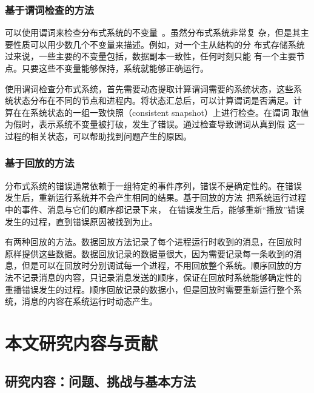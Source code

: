 \subsubsection*{基于谓词检查的方法}

可以使用谓词来检查分布式系统的不变量~\cite{d3s}。虽然分布式系统非常复
杂，但是其主要性质可以用少数几个不变量来描述。例如，对一个主从结构的分
布式存储系统过来说，一些主要的不变量包括，数据副本一致性，任何时刻只能
有一个主要节点。只要这些不变量能够保持，系统就能够正确运行。

使用谓词检查分布式系统，首先需要动态提取计算谓词需要的系统状态，这些系
统状态分布在不同的节点和进程内。将状态汇总后，可以计算谓词是否满足。计
算在在系统状态的一组一致快照（consistent snapshot）上进行检查。在谓词
取值为假时，表示系统不变量被打破，发生了错误。通过检查导致谓词从真到假
这一过程的相关状态，可以帮助找到问题产生的原因。

\subsubsection*{基于回放的方法}

分布式系统的错误通常依赖于一组特定的事件序列，错误不是确定性的。在错误
发生后，重新运行系统并不会产生相同的结果。基于回放的方法~\cite{liblog,
friday, r2, mpiwiz}把系统运行过程中的事件、消息与它们的顺序都记录下来，
在错误发生后，能够重新“播放”错误发生的过程，直到错误原因被找到为止。

有两种回放的方法。数据回放方法记录了每个进程运行时收到的消息，在回放时
原样提供这些数据。数据回放记录的数据量很大，因为需要记录每一条收到的消
息，但是可以在回放时分别调试每一个进程，不用回放整个系统。顺序回放的方
法不记录消息的内容，只记录消息发送的顺序，保证在回放时系统能够确定性的
重播错误发生的过程。顺序回放记录的数据小，但是回放时需要重新运行整个系
统，消息的内容在系统运行时动态产生。

% 
% 
% 
% 
% 
% 
% 
% 
% 
% 


\section{本文研究内容与贡献}
\label{sec:intro_contrib}

\subsection{研究内容：问题、挑战与基本方法}

